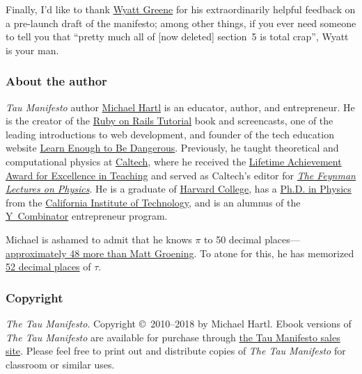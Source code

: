 Finally, I'd like to thank \href{https://techiferous.com/}{Wyatt Greene} for his extraordinarily helpful feedback on a pre-launch draft of the manifesto; among other things, if you ever need someone to tell you that ``pretty much all of [now deleted] section~5 is total crap'', Wyatt is your man.



    \subsubsection{About the author} %
    \label{sec:about_the_author}


\emph{Tau Manifesto} author \href{https://www.michaelhartl.com/}{Michael Hartl} is an educator, author, and entrepreneur. He is the creator of the \href{https://www.railstutorial.org/}{Ruby on Rails Tutorial} book and screencasts, one of the leading introductions to web development, and founder of the tech education website \href{https://learnenough.com/}{Learn Enough to Be Dangerous}. Previously, he taught theoretical and computational physics at  \href{https://www.caltech.edu/}{Caltech}, where he received the \href{https://www.michaelhartl.com/ascit/awards2000.html}{Lifetime Achievement Award for Excellence in Teaching} and served as Caltech's editor for \href{https://www.feynmanlectures.caltech.edu/}{\emph{The Feynman Lectures on Physics}}. He is a graduate of \href{https://college.harvard.edu/}{Harvard College}, has a \href{https://thesis.library.caltech.edu/1940/}{Ph.D. in Physics} from the \href{https://www.caltech.edu/}{California Institute of Technology}, and is an alumnus of the \href{https://ycombinator.com/}{Y~Combinator} entrepreneur program.

Michael is ashamed to admit that he knows $\pi$ to 50 decimal places---\href{\#fig-futurama_video}{ap\-prox\-imately 48 more than Matt Groening}. To atone for this, he has memorized \href{https://www.wolframalpha.com/input/?i=N[2+Pi,+53]}{52 decimal places} of $\tau$.

    \subsubsection{Copyright} %
    \label{sec:copyright_and_license}

    \emph{The Tau Manifesto}. Copyright \copyright\ 2010--2018 by Michael Hartl. Ebook versions of \emph{The Tau Manifesto} are available for purchase through \href{https://sales.tauday.com/}{the Tau Manifesto sales site}. Please feel free to print out and distribute copies of \emph{The Tau Manifesto} for classroom or similar uses.

